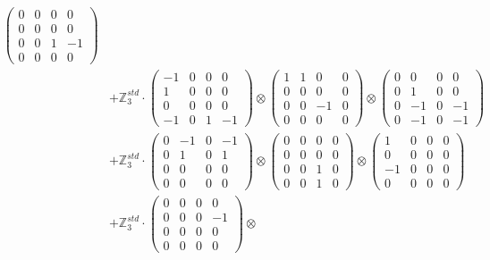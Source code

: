 \documentclass{article}
\begin{document}
{\begin{align}
            \begin{pmatrix} 0 & 0 & 0 & 0 \\ 0 & 0 & 0 & 0 \\ 0 & 0 & 1 & -1 \\ 0 & 0 & 0 & 0 \end{pmatrix} \\ 
        &+ \label{Rs1-Rc16-Solution-4-c15} \mathbb{Z}_3^{std} \cdot 
            \begin{pmatrix} -1 & 0 & 0 & 0 \\ 1 & 0 & 0 & 0 \\ 0 & 0 & 0 & 0 \\ -1 & 0 & 1 & -1 \end{pmatrix} \otimes 
            \begin{pmatrix} 1 & 1 & 0 & 0 \\ 0 & 0 & 0 & 0 \\ 0 & 0 & -1 & 0 \\ 0 & 0 & 0 & 0 \end{pmatrix} \otimes 
            \begin{pmatrix} 0 & 0 & 0 & 0 \\ 0 & 1 & 0 & 0 \\ 0 & -1 & 0 & -1 \\ 0 & -1 & 0 & -1 \end{pmatrix} \\ 
        &+ \label{Rs1-Rc16-Solution-4-c16} \mathbb{Z}_3^{std} \cdot 
            \begin{pmatrix} 0 & -1 & 0 & -1 \\ 0 & 1 & 0 & 1 \\ 0 & 0 & 0 & 0 \\ 0 & 0 & 0 & 0 \end{pmatrix} \otimes 
            \begin{pmatrix} 0 & 0 & 0 & 0 \\ 0 & 0 & 0 & 0 \\ 0 & 0 & 1 & 0 \\ 0 & 0 & 1 & 0 \end{pmatrix} \otimes 
            \begin{pmatrix} 1 & 0 & 0 & 0 \\ 0 & 0 & 0 & 0 \\ -1 & 0 & 0 & 0 \\ 0 & 0 & 0 & 0 \end{pmatrix} \\ 
        &+ \label{Rs1-Rc16-Solution-4-c17} \mathbb{Z}_3^{std} \cdot 
            \begin{pmatrix} 0 & 0 & 0 & 0 \\ 0 & 0 & 0 & -1 \\ 0 & 0 & 0 & 0 \\ 0 & 0 & 0 & 0 \end{pmatrix} \otimes 

\end{align}}
\end{document}
